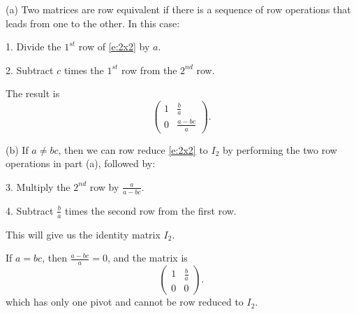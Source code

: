 \documentclass{ximera}
\begin{document}
\begin{exercise}
\begin{solution}

(a)
Two matrices are row equivalent if there is a sequence of row operations
that leads from one to the other.  In this case:

1. Divide the $1^{st}$ row of \eqref{e:2x2} by $a$.

2. Subtract $c$ times the $1^{st}$ row from the $2^{nd}$ row.

The result is
\[
\left(\begin{array}{cc} 1 & \frac{b}{a} \\ 0 & \frac{a - bc}{a}\end{array}
\right).
\]

(b) If $a \neq bc$, then we can row reduce \eqref{e:2x2} to $I_2$ by
performing the two row operations in part (a), followed by:

3. Multiply the $2^{nd}$ row by $\frac{a}{a - bc}$.

4. Subtract $\frac{b}{a}$ times the second row from the first row.

This will give us the identity matrix $I_2$.

\para If $a = bc$, then $\frac{a - bc}{a} = 0$, and the matrix is
\[
\left(\begin{array}{cc} 1 & \frac{b}{a} \\ 0 & 0\end{array} \right).
\]
which has only one pivot and cannot be row reduced to $I_2$.

\end{solution}
\end{exercise}
\end{document}
